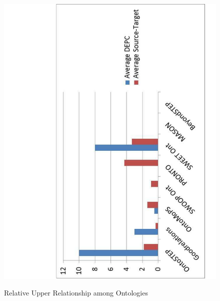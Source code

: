 \begin{figure}
	\begin{center}
		\vspace{-20mm}
		\includegraphics[scale=0.5, angle=-90]{figure-chapterIV/fig4-13.pdf}\\
		\caption{Relative Upper Relationship among Ontologies}
		\label{figure4-13}
	\end{center}
\end{figure}



